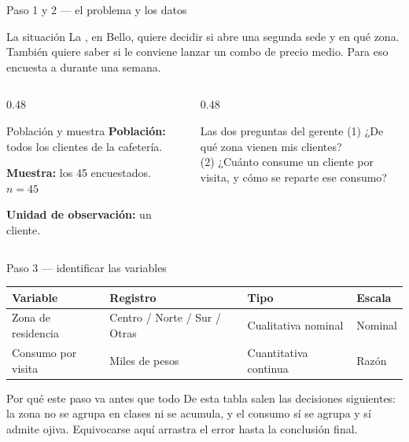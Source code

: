 \documentclass[aspectratio=169,10pt]{beamer}
\begin{document}

\begin{frame}{Paso 1 y 2 — el problema y los datos}
  \begin{exampleblock}{La situación}
    \footnotesize
    La , en Bello, quiere decidir si abre una segunda
    sede y en qué zona. También quiere saber si le conviene lanzar un combo de
    precio medio. Para eso encuesta a  durante una
    semana.
  \end{exampleblock}

  \vspace{0.2cm}
  \begin{columns}[T,onlytextwidth]
    \begin{column}{0.48\textwidth}
      \begin{block}{Población y muestra}
        \scriptsize
        \textbf{Población:} todos los clientes de la cafetería.

        \textbf{Muestra:} los 45 encuestados. \quad $n = 45$

        \textbf{Unidad de observación:} un cliente.
      \end{block}
    \end{column}
    \begin{column}{0.48\textwidth}
      \begin{alertblock}{Las dos preguntas del gerente}
        \scriptsize
        (1) ¿De qué zona vienen mis clientes? \\
        (2) ¿Cuánto consume un cliente por visita, y cómo se reparte ese
        consumo?
      \end{alertblock}
    \end{column}
  \end{columns}
\end{frame}

\begin{frame}{Paso 3 — identificar las variables}
  \footnotesize
  \begin{center}
  \begin{tabular}{@{}p{3.1cm}p{3.5cm}p{2.6cm}p{2.6cm}@{}}
    \toprule
    \textbf{Variable} & \textbf{Registro} & \textbf{Tipo} & \textbf{Escala} \\
    \midrule
    Zona de residencia & Centro / Norte / Sur / Otras & Cualitativa nominal
      & Nominal \\
    \addlinespace
    Consumo por visita & Miles de pesos & Cuantitativa continua & Razón \\
    \bottomrule
  \end{tabular}
  \end{center}

  \vspace{0.2cm}
  \begin{alertblock}{Por qué este paso va antes que todo}
    \scriptsize
    De esta tabla salen  las decisiones siguientes: la zona no
    se agrupa en clases ni se acumula, y el consumo sí se agrupa y sí admite
    ojiva. Equivocarse aquí arrastra el error hasta la conclusión final.
  \end{alertblock}
\end{frame}
\end{document}
